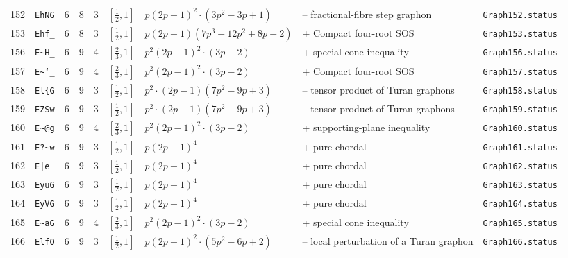 \begin{landscape}
\begin{longtable}{r l r r r l p{4.0cm} p{3.5cm} p{2.7cm}}
152 & \texttt{EhNG} & 6 & 8 & 3 & $[\frac{1}{2},1]$ & $p \left(2 p - 1\right)^{2} \cdot \left(3 p^{2} - 3 p + 1\right)$ & -- fractional-fibre step graphon & \texttt{Graph152.status}\\
153 & \texttt{Ehf\_} & 6 & 8 & 3 & $[\frac{1}{2},1]$ & $p \left(2 p - 1\right) \left(7 p^{3} - 12 p^{2} + 8 p - 2\right)$ & + Compact four-root SOS & \texttt{Graph153.status}\\
156 & \texttt{E\textasciitilde{}H\_} & 6 & 9 & 4 & $[\frac{2}{3},1]$ & $p^{2} \left(2 p - 1\right)^{2} \cdot \left(3 p - 2\right)$ & + special cone inequality & \texttt{Graph156.status}\\
157 & \texttt{E\textasciitilde{}`\_} & 6 & 9 & 4 & $[\frac{2}{3},1]$ & $p^{2} \left(2 p - 1\right)^{2} \cdot \left(3 p - 2\right)$ & + Compact four-root SOS & \texttt{Graph157.status}\\
158 & \texttt{El\{G} & 6 & 9 & 3 & $[\frac{1}{2},1]$ & $p^{2} \cdot \left(2 p - 1\right) \left(7 p^{2} - 9 p + 3\right)$ & -- tensor product of Turan graphons & \texttt{Graph158.status}\\
159 & \texttt{EZSw} & 6 & 9 & 3 & $[\frac{1}{2},1]$ & $p^{2} \cdot \left(2 p - 1\right) \left(7 p^{2} - 9 p + 3\right)$ & -- tensor product of Turan graphons & \texttt{Graph159.status}\\
160 & \texttt{E\textasciitilde{}@g} & 6 & 9 & 4 & $[\frac{2}{3},1]$ & $p^{2} \left(2 p - 1\right)^{2} \cdot \left(3 p - 2\right)$ & + supporting-plane inequality & \texttt{Graph160.status}\\
161 & \texttt{E?\textasciitilde{}w} & 6 & 9 & 3 & $[\frac{1}{2},1]$ & $p \left(2 p - 1\right)^{4}$ & + pure chordal & \texttt{Graph161.status}\\
162 & \texttt{E|e\_} & 6 & 9 & 3 & $[\frac{1}{2},1]$ & $p \left(2 p - 1\right)^{4}$ & + pure chordal & \texttt{Graph162.status}\\
163 & \texttt{EyuG} & 6 & 9 & 3 & $[\frac{1}{2},1]$ & $p \left(2 p - 1\right)^{4}$ & + pure chordal & \texttt{Graph163.status}\\
164 & \texttt{EyVG} & 6 & 9 & 3 & $[\frac{1}{2},1]$ & $p \left(2 p - 1\right)^{4}$ & + pure chordal & \texttt{Graph164.status}\\
165 & \texttt{E\textasciitilde{}aG} & 6 & 9 & 4 & $[\frac{2}{3},1]$ & $p^{2} \left(2 p - 1\right)^{2} \cdot \left(3 p - 2\right)$ & + special cone inequality & \texttt{Graph165.status}\\
166 & \texttt{ElfO} & 6 & 9 & 3 & $[\frac{1}{2},1]$ & $p \left(2 p - 1\right)^{2} \cdot \left(5 p^{2} - 6 p + 2\right)$ & -- local perturbation of a Turan graphon & \texttt{Graph166.status}\\

\end{longtable}
\end{landscape}
